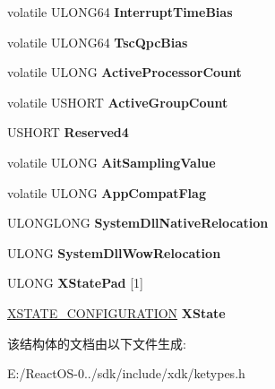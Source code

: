 \begin{DoxyCompactItemize}
volatile U\+L\+O\+N\+G64 {\bfseries Interrupt\+Time\+Bias}
\item 
\mbox{\label{struct___k_u_s_e_r___s_h_a_r_e_d___d_a_t_a_a4c954c9afb17067a70a9b7189dd4e649}} 
volatile U\+L\+O\+N\+G64 {\bfseries Tsc\+Qpc\+Bias}
\item 
\mbox{\label{struct___k_u_s_e_r___s_h_a_r_e_d___d_a_t_a_ac54c2d72d92176e3c5b4c17a07945154}} 
volatile U\+L\+O\+NG {\bfseries Active\+Processor\+Count}
\item 
\mbox{\label{struct___k_u_s_e_r___s_h_a_r_e_d___d_a_t_a_adc235d4eff8d158b0877bf00abd00349}} 
volatile U\+S\+H\+O\+RT {\bfseries Active\+Group\+Count}
\item 
\mbox{\label{struct___k_u_s_e_r___s_h_a_r_e_d___d_a_t_a_a59499b1c14ec089c4a07597f73e8823c}} 
U\+S\+H\+O\+RT {\bfseries Reserved4}
\item 
\mbox{\label{struct___k_u_s_e_r___s_h_a_r_e_d___d_a_t_a_a92886788ade90e64c76418df9fcadd3e}} 
volatile U\+L\+O\+NG {\bfseries Ait\+Sampling\+Value}
\item 
\mbox{\label{struct___k_u_s_e_r___s_h_a_r_e_d___d_a_t_a_a8cdd6ce0e050bf6daff22e55f8ff6597}} 
volatile U\+L\+O\+NG {\bfseries App\+Compat\+Flag}
\item 
\mbox{\label{struct___k_u_s_e_r___s_h_a_r_e_d___d_a_t_a_a3bdb998325e58a5dbcaf1ca7d6cad20c}} 
U\+L\+O\+N\+G\+L\+O\+NG {\bfseries System\+Dll\+Native\+Relocation}
\item 
\mbox{\label{struct___k_u_s_e_r___s_h_a_r_e_d___d_a_t_a_adfc9ae56ffe7e51645e7c06749ee20eb}} 
U\+L\+O\+NG {\bfseries System\+Dll\+Wow\+Relocation}
\item 
\mbox{\label{struct___k_u_s_e_r___s_h_a_r_e_d___d_a_t_a_ab3482c1cfc45886e9f1d34c8fd57c35e}} 
U\+L\+O\+NG {\bfseries X\+State\+Pad} \mbox{[}1\mbox{]}
\item 
\mbox{\label{struct___k_u_s_e_r___s_h_a_r_e_d___d_a_t_a_a0954bfcd99877ce2c6485f653f3d21df}} 
\hyperlink{struct___x_s_t_a_t_e___c_o_n_f_i_g_u_r_a_t_i_o_n}{X\+S\+T\+A\+T\+E\+\_\+\+C\+O\+N\+F\+I\+G\+U\+R\+A\+T\+I\+ON} {\bfseries X\+State}
\end{DoxyCompactItemize}


该结构体的文档由以下文件生成\+:\begin{DoxyCompactItemize}
\item 
E\+:/\+React\+O\+S-\/0../sdk/include/xdk/ketypes.\+h\end{DoxyCompactItemize}
